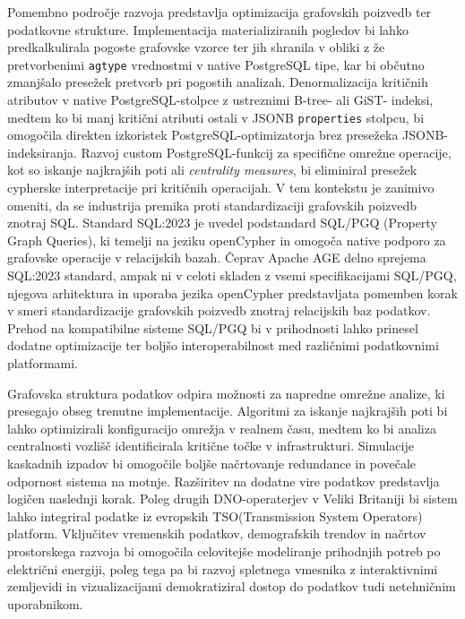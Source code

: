 \documentclass[a4paper,12pt,openright]{book}
\begin{document}
Pomembno področje razvoja predstavlja optimizacija grafovskih poizvedb ter podatkovne strukture. Implementacija materializiranih pogledov bi lahko predkalkulirala pogoste grafovske vzorce ter jih shranila v obliki z že pretvorbenimi \texttt{agtype} vrednostmi v native PostgreSQL tipe, kar bi občutno zmanjšalo presežek pretvorb pri pogostih analizah. Denormalizacija kritičnih atributov v native PostgreSQL-stolpce z ustreznimi B-tree- ali GiST- indeksi, medtem ko bi manj kritični atributi ostali v JSONB \texttt{properties} stolpcu, bi omogočila direkten izkoristek PostgreSQL-optimizatorja brez presežeka JSONB-indeksiranja. Razvoj custom PostgreSQL-funkcij za specifične omrežne operacije, kot so iskanje najkrajših poti ali \textit{centrality measures}, bi eliminiral presežek cypherske interpretacije pri kritičnih operacijah. V tem kontekstu je zanimivo omeniti, da se industrija premika proti standardizaciji grafovskih poizvedb znotraj SQL. Standard SQL:2023 \cite{rotschield2025expressivenesslanguagesqueryingproperty} je uvedel podstandard SQL/PGQ (Property Graph Queries), ki temelji na jeziku openCypher in omogoča native podporo za grafovske operacije v relacijskih bazah. Čeprav Apache AGE delno sprejema SQL:2023 standard, ampak ni v celoti skladen z vsemi specifikacijami SQL/PGQ, njegova arhitektura in uporaba jezika openCypher predstavljata pomemben korak v smeri standardizacije grafovskih poizvedb znotraj relacijskih baz podatkov. Prehod na kompatibilne sisteme SQL/PGQ bi v prihodnosti lahko prinesel dodatne optimizacije ter boljšo interoperabilnost med različnimi podatkovnimi platformami.

Grafovska struktura podatkov odpira možnosti za napredne omrežne analize, ki presegajo obseg trenutne implementacije. Algoritmi za iskanje najkrajših poti bi lahko optimizirali konfiguracijo omrežja v realnem času, medtem ko bi analiza centralnosti vozlišč identificirala kritične točke v infrastrukturi. Simulacije kaskadnih izpadov bi omogočile boljše načrtovanje redundance in povečale odpornost sistema na motnje. Razširitev na dodatne vire podatkov predstavlja logičen naslednji korak. Poleg drugih DNO-operaterjev v Veliki Britaniji bi sistem lahko integriral podatke iz evropskih TSO(Transmission System Operators) platform. Vključitev vremenskih podatkov, demografskih trendov in načrtov prostorskega razvoja bi omogočila celovitejše modeliranje prihodnjih potreb po električni energiji, poleg tega pa bi razvoj spletnega vmesnika z interaktivnimi zemljevidi in vizualizacijami demokratiziral dostop do podatkov tudi netehničnim uporabnikom.
\end{document}
